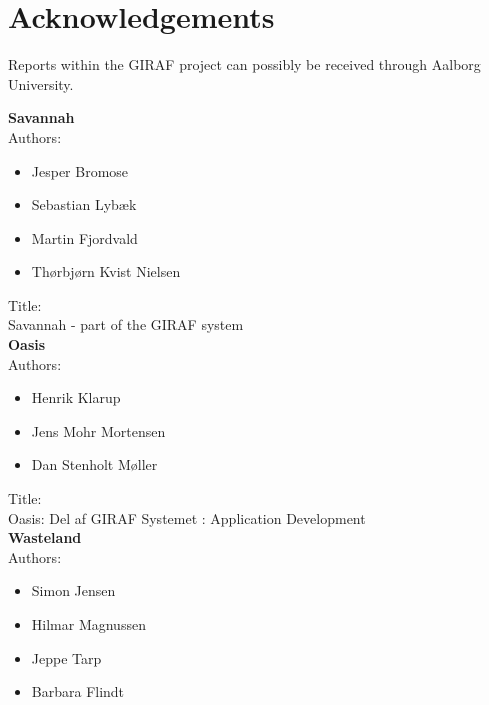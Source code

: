 \chapter{Acknowledgements}
\label{acknowledgement}
Reports within the GIRAF project can possibly be received through Aalborg University.   

\textbf{Savannah}\\
Authors:\\ 
\begin{itemize}
\item Jesper Bromose\\
\item Sebastian Lybæk\\
\item Martin Fjordvald\\
\item Thørbjørn Kvist Nielsen\\
\end{itemize}

Title:\\
Savannah - part of the GIRAF system\\

\textbf{Oasis}\\
Authors:\\
\begin{itemize}
\item Henrik Klarup\\
\item Jens Mohr Mortensen\\
\item Dan Stenholt Møller\\
\end{itemize}

Title:\\
Oasis: Del af GIRAF Systemet : Application Development\\


\textbf{Wasteland}\\
Authors:\\
\begin{itemize}
\item Simon Jensen\\
\item Hilmar Magnussen\\
\item Jeppe Tarp\\
\item Barbara Flindt\\
\end{itemize}

